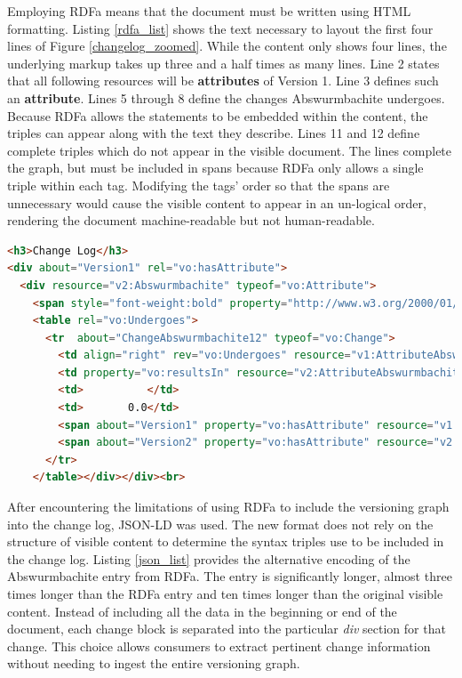 Employing RDFa means that the document must be written using HTML formatting.
Listing \ref{rdfa_list} shows the text necessary to layout the first four lines of Figure \ref{changelog_zoomed}.
While the content only shows four lines, the underlying markup takes up three and a half times as many lines.
Line 2 states that all following resources will be \textbf{attributes} of Version 1.
Line 3 defines such an \textbf{attribute}.
Lines 5 through 8 define the changes Abswurmbachite undergoes.
Because RDFa allows the statements to be embedded within the content, the triples can appear along with the text they describe.
Lines 11 and 12 define complete triples which do not appear in the visible document.
The lines complete the graph, but must be included in spans because RDFa only allows a single triple within each tag.
Modifying the tags' order so that the spans are unnecessary would cause the visible content to appear in an un-logical order, rendering the document machine-readable but not human-readable.

\begin{lstlisting}[language=HTML, caption=Abswurmbachite RDFa, label=rdfa_list]
<h3>Change Log</h3>
<div about="Version1" rel="vo:hasAttribute">
  <div resource="v2:Abswurmbachite" typeof="vo:Attribute">
    <span style="font-weight:bold" property="http://www.w3.org/2000/01/rdf-schema#label">Abswurmbachite</span>
    <table rel="vo:Undergoes">
      <tr  about="ChangeAbswurmbachite12" typeof="vo:Change">
        <td align="right" rev="vo:Undergoes" resource="v1:AttributeAbswurmbachite12v1" typeof="vo:Attribute"> 9</td>
        <td property="vo:resultsIn" resource="v2:AttributeAbswurmbachite12v2" typeof="vo:Attribute">(12)</td>
        <td>          </td>
        <td>       0.0</td>
        <span about="Version1" property="vo:hasAttribute" resource="v1:AttributeAbswurmbachite12v1"></span>
        <span about="Version2" property="vo:hasAttribute" resource="v2:AttributeAbswurmbachite12v2"></span>
      </tr>
    </table></div></div><br>
\end{lstlisting}

After encountering the limitations of using RDFa to include the versioning graph into the change log, JSON-LD was used.
The new format does not rely on the structure of visible content to determine the syntax triples use to be included in the change log.
Listing \ref{json_list} provides the alternative encoding of the Abswurmbachite entry from RDFa.
The entry is significantly longer, almost three times longer than the RDFa entry and ten times longer than the original visible content.
Instead of including all the data in the beginning or end of the document, each change block is separated into the particular \textit{div} section for that change.
This choice allows consumers to extract pertinent change information without needing to ingest the entire versioning graph.

